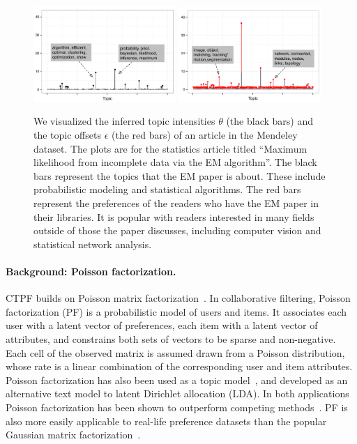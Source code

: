 \documentclass{article}
\begin{document}
\begin{figure}[t!]
\centering
\includegraphics[width=0.48\textwidth]{../fig/pdf/em_algorithm1.pdf}
\includegraphics[width=0.48\textwidth]{../fig/pdf/em_algorithm2.pdf}\\
\caption{We visualized the inferred topic intensities $\theta$ (the
  black bars) and the topic offsets $\epsilon$ (the red bars) of an
  article in the Mendeley~\cite{Jack:2010} dataset.  The plots are for
  the statistics article titled ``Maximum likelihood from incomplete
  data via the EM algorithm''.  The black bars represent the topics
  that the EM paper is about. These include probabilistic modeling and
  statistical algorithms. The red bars represent the preferences of
  the readers who have the EM paper in their libraries. It is popular
  with readers interested in many fields outside of those the paper
  discusses, including computer vision and statistical network
  analysis.}

\label{fig:em_alg}
\end{figure}

\paragraph{Background: Poisson factorization.} 
CTPF builds on Poisson matrix factorization~\cite{Gopalan:2013b}. In
collaborative filtering, Poisson factorization (PF) is a probabilistic
model of users and items. It associates each user with a latent vector
of preferences, each item with a latent vector of attributes, and
constrains both sets of vectors to be sparse and non-negative. Each
cell of the observed matrix is assumed drawn from a Poisson
distribution, whose rate is a linear combination of the corresponding
user and item attributes. Poisson factorization has also been used as
a topic model~\cite{Canny:2004}, and developed as an alternative text
model to latent Dirichlet allocation (LDA). In both applications
Poisson factorization has been shown to outperform competing
methods~\cite{Canny:2004, Gopalan:2013b}.  PF is also more easily
applicable to real-life preference datasets than the popular Gaussian
matrix factorization~\cite{Gopalan:2013b}. 
\end{document}
